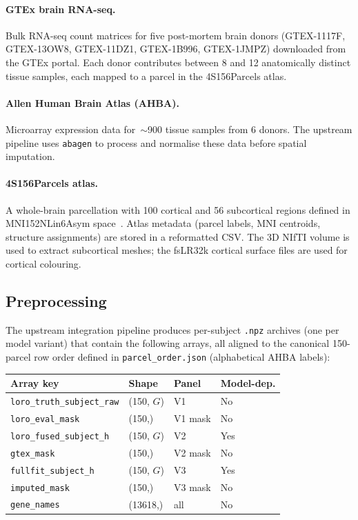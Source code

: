 \documentclass[11pt,letterpaper]{article}
\begin{document}
\paragraph{GTEx brain RNA-seq.}
Bulk RNA-seq count matrices for five post-mortem brain donors
(GTEX-1117F, GTEX-13OW8, GTEX-11DZ1, GTEX-1B996, GTEX-1JMPZ)
downloaded from the GTEx portal.
Each donor contributes between 8 and 12 anatomically distinct tissue samples,
each mapped to a parcel in the 4S156Parcels atlas.

\paragraph{Allen Human Brain Atlas (AHBA).}
Microarray expression data for~$\sim$900 tissue samples from 6 donors.
The upstream pipeline uses \texttt{abagen} to process and normalise these
data before spatial imputation.

\paragraph{4S156Parcels atlas.}
A whole-brain parcellation with 100 cortical and 56 subcortical regions
defined in MNI152NLin6Asym space~\citep{TODO-atlas-citation}.
Atlas metadata (parcel labels, MNI centroids, structure assignments)
are stored in a reformatted CSV.
The 3D NIfTI volume is used to extract subcortical meshes; the
fsLR32k cortical surface files are used for cortical colouring.

\subsection{Preprocessing}

The upstream integration pipeline produces per-subject \texttt{.npz} archives
(one per model variant) that contain the following arrays, all aligned to
the canonical 150-parcel row order defined in \texttt{parcel\_order.json}
(alphabetical AHBA labels):

\begin{center}
\begin{tabular}{llll}
\toprule
Array key & Shape & Panel & Model-dep.\\
\midrule
\texttt{loro\_truth\_subject\_raw} & (150, $G$) & V1 & No \\
\texttt{loro\_eval\_mask}         & (150,)     & V1 mask & No \\
\texttt{loro\_fused\_subject\_h}  & (150, $G$) & V2 & Yes \\
\texttt{gtex\_mask}               & (150,)     & V2 mask & No \\
\texttt{fullfit\_subject\_h}      & (150, $G$) & V3 & Yes \\
\texttt{imputed\_mask}            & (150,)     & V3 mask & No \\
\texttt{gene\_names}              & (13618,)   & all & No \\
\bottomrule
\end{tabular}
\end{center}
\end{document}
